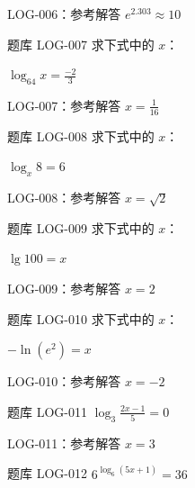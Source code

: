 \documentclass[aspectratio=169,10pt]{beamer}
\begin{document}
\ifdefined\TeacherEdition
\begin{frame}[t]{LOG-006：参考解答}
$e^{2.303}\approx10$
\end{frame}
\fi

\begin{campuspractice}{题库 LOG-007}
求下式中的 $x$：\par
$\log_{64}x=\frac{-2}{3}$
\end{campuspractice}

\ifdefined\TeacherEdition
\begin{frame}[t]{LOG-007：参考解答}
$x=\frac1{16}$
\end{frame}
\fi

\begin{campuspractice}{题库 LOG-008}
求下式中的 $x$：\par
$\log_x8=6$
\end{campuspractice}

\ifdefined\TeacherEdition
\begin{frame}[t]{LOG-008：参考解答}
$x=\sqrt2$
\end{frame}
\fi

\begin{campuspractice}{题库 LOG-009}
求下式中的 $x$：\par
$\lg100=x$
\end{campuspractice}

\ifdefined\TeacherEdition
\begin{frame}[t]{LOG-009：参考解答}
$x=2$
\end{frame}
\fi

\begin{campuspractice}{题库 LOG-010}
求下式中的 $x$：\par
$-\ln(e^2)=x$
\end{campuspractice}

\ifdefined\TeacherEdition
\begin{frame}[t]{LOG-010：参考解答}
$x=-2$
\end{frame}
\fi

\begin{campuspractice}{题库 LOG-011}
$\log_3\frac{2x-1}{5}=0$
\end{campuspractice}

\ifdefined\TeacherEdition
\begin{frame}[t]{LOG-011：参考解答}
$x=3$
\end{frame}
\fi

\begin{campuspractice}{题库 LOG-012}
$6^{\log_6(5x+1)}=36$
\end{campuspractice}
\end{document}
